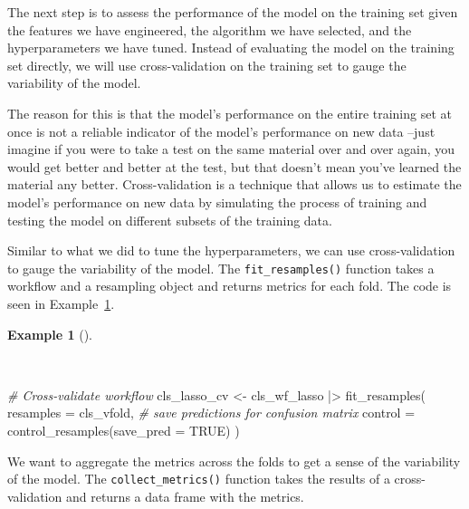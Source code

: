 \documentclass[
  letterpaper,
  krantz1]{latex/krantz-mod}
\newenvironment{Shaded}{\begin{snugshade}}{\end{snugshade}}
\newcommand{\AttributeTok}[1]{\textcolor[rgb]{0.00,0.00,0.00}{#1}}
\newcommand{\CommentTok}[1]{\textcolor[rgb]{0.00,0.00,0.00}{\textit{#1}}}
\newcommand{\ConstantTok}[1]{\textcolor[rgb]{0.00,0.00,0.00}{#1}}
\newcommand{\FunctionTok}[1]{\textcolor[rgb]{0.00,0.00,0.00}{#1}}
\newcommand{\NormalTok}[1]{\textcolor[rgb]{0.00,0.00,0.00}{#1}}
\newcommand{\OtherTok}[1]{\textcolor[rgb]{0.00,0.00,0.00}{#1}}
\newcommand{\SpecialCharTok}[1]{\textcolor[rgb]{0.00,0.00,0.00}{#1}}
\theoremstyle{definition}
\newtheorem{example}{Example}[chapter]
\theoremstyle{definition}
\theoremstyle{remark}
\begin{document}
The next step is to assess the performance of the model on the training
set given the features we have engineered, the algorithm we have
selected, and the hyperparameters we have tuned. Instead of evaluating
the model on the training set directly, we will use cross-validation on
the training set to gauge the variability of the model.

The reason for this is that the model's performance on the entire
training set at once is not a reliable indicator of the model's
performance on new data --just imagine if you were to take a test on the
same material over and over again, you would get better and better at
the test, but that doesn't mean you've learned the material any better.
Cross-validation is a technique that allows us to estimate the model's
performance on new data by simulating the process of training and
testing the model on different subsets of the training data.

Similar to what we did to tune the hyperparameters, we can use
cross-validation to gauge the variability of the model. The
\texttt{fit\_resamples()} function takes a workflow and a resampling
object and returns metrics for each fold. The code is seen in
Example~\ref{exm-predict-class-tune-hyperparameters-evaluate-workflow-cv}.

\begin{example}[]\protect\hypertarget{exm-predict-class-tune-hyperparameters-evaluate-workflow-cv}{}\label{exm-predict-class-tune-hyperparameters-evaluate-workflow-cv}

~

\begin{Shaded}
\begin{Highlighting}[numbers=left,,]
\CommentTok{\# Cross{-}validate workflow}
\NormalTok{cls\_lasso\_cv }\OtherTok{\textless{}{-}}
\NormalTok{  cls\_wf\_lasso }\SpecialCharTok{|\textgreater{}}
  \FunctionTok{fit\_resamples}\NormalTok{(}
    \AttributeTok{resamples =}\NormalTok{ cls\_vfold,}
    \CommentTok{\# save predictions for confusion matrix}
    \AttributeTok{control =} \FunctionTok{control\_resamples}\NormalTok{(}\AttributeTok{save\_pred =} \ConstantTok{TRUE}\NormalTok{)}
\NormalTok{  )}
\end{Highlighting}
\end{Shaded}

\end{example}

We want to aggregate the metrics across the folds to get a sense of the
variability of the model. The \texttt{collect\_metrics()} function takes
the results of a cross-validation and returns a data frame with the
metrics.
\end{document}
